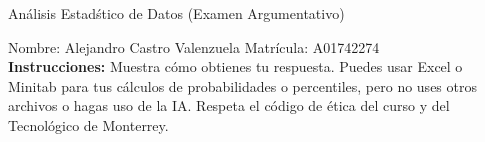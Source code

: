 \documentclass[8pt]{report}
\begin{document}
\newpage



\begin{center}
{An\'alisis Estad\'stico de Datos (Examen Argumentativo)}
\end{center}

Nombre: \underline{\hspace*{.2in}}
Alejandro Castro Valenzuela
\underline{\hspace*{.2in}} \quad Matr\'icula:\underline{\hspace*{.2in}}
A01742274
\underline{\hspace*{.2in}} \\

{\bf Instrucciones:} Muestra c\'omo obtienes tu respuesta. Puedes usar Excel 
o Minitab para tus cálculos de probabilidades o 
percentiles, pero no uses otros archivos o hagas uso de la IA. Respeta el 
c\'odigo de \'etica del curso y del Tecnol\'ogico 
de Monterrey.
\end{document}
